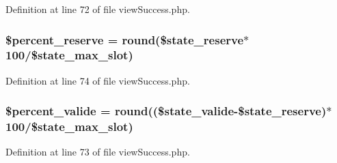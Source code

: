 Definition at line 72 of file view\-Success.\-php.

\hypertarget{backend_2modules_2tournament_2templates_2view_success_8php_a23da4a29d9c1250ffead2a95108677d3}{
\subsubsection[{\$percent\-\_\-reserve}]{\setlength{\rightskip}{0pt plus 5cm}\$percent\-\_\-reserve = round(\$state\-\_\-reserve$\ast$100/\$state\-\_\-max\-\_\-slot)}}\label{backend_2modules_2tournament_2templates_2view_success_8php_a23da4a29d9c1250ffead2a95108677d3}


Definition at line 74 of file view\-Success.\-php.

\hypertarget{backend_2modules_2tournament_2templates_2view_success_8php_aa49d95103fa982ed10c0bca6032b59a9}{
\subsubsection[{\$percent\-\_\-valide}]{\setlength{\rightskip}{0pt plus 5cm}\$percent\-\_\-valide = round((\$state\-\_\-valide-\/\$state\-\_\-reserve)$\ast$100/\$state\-\_\-max\-\_\-slot)}}\label{backend_2modules_2tournament_2templates_2view_success_8php_aa49d95103fa982ed10c0bca6032b59a9}


Definition at line 73 of file view\-Success.\-php.

